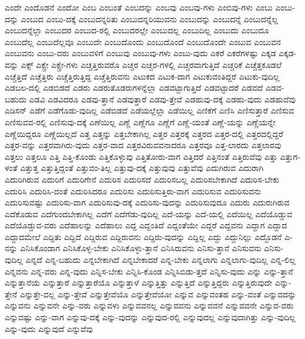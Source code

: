 {ಎಂದೇ
ಎಂದೊಡನೆ
ಎಂದೋ
ಎಂಬ
ಎಂಬಂತೆ
ಎಂಬದನ್ನು
ಎಂಬವು
ಎಂಬವು-ಗಳು
ಎಂಬಿವು-ಗಳು
ಎಂಬು
ಎಂಬು-ದನ್ನು
ಎಂಬುದ
ಎಂಬು-ದಕ್ಕೆ
ಎಂಬುದನ್ನರಿತು
ಎಂಬುದನ್ನರಿಯುವನು
ಎಂಬುದನ್ನು
ಎಂಬುದನ್ನೆ
ಎಂಬುದನ್ನೆಲ್ಲ
ಎಂಬುದನ್ನೆಲ್ಲಾ
ಎಂಬುದರ
ಎಂಬುದ-ರಲ್ಲಿ
ಎಂಬುದರಲ್ಲೇ
ಎಂಬುದಲ್ಲ
ಎಂಬುದಿಲ್ಲ
ಎಂಬುದು
ಎಂಬುದೂ
ಎಂಬುದೆಲ್ಲ
ಎಂಬುದೆಲ್ಲವೂ
ಎಂಬುದೇ
ಎಂಬುದೊಂದು
ಎಂಬುದೊಂದೆ
ಎಂಬುದೊಂದೇ
ಎಂಬುವ
ಎಂಬುವನ
ಎಂಬುವನು
ಎಂಬು-ವರು
ಎಂಬುವಳಿಗೆ
ಎಂಬುವು
ಎಂಬುವು-ಗಳು
ಎಂಬು-ವುದು
ಎಕರೆ
ಎಕರೆಗಳಷ್ಟು
ಎಕ್ಕಡ
ಎಕ್ಕಡ-ವನ್ನು
ಎಕ್ಸ್
ಎಕ್ಸ್ರೇ
ಎಕ್ಸ್ರೇ-ಗಳು
ಎಚ್ಚತ್ತಿರುವರೊ
ಎಚ್ಚರ
ಎಚ್ಚರ-ಗಳಲ್ಲಿ
ಎಚ್ಚರವಾಗುತ್ತಿದೆ
ಎಚ್ಚರಿಕೆ
ಎಚ್ಚೆತ್ತಕೂಡಲೆ
ಎಚ್ಚೆತ್ತಿದೆ
ಎಚ್ಚೆತ್ತಿರು
ಎಚ್ಚೆತ್ತಿರುತ್ತಿದ್ದ
ಎಚ್ಚೆತ್ತಿರುವನು
ಎಟುಕದ
ಎಟುಕ-ದಾಗ
ಎಟುಕುವಂತಿದ್ದರೆ
ಎಟುಕು-ವುದಿಲ್ಲ
ಎಡಬಲ-ದಲ್ಲಿ
ಎಡಬಿಡದೆ
ಎಡರು
ಎಡರುತೊಡರುಗಳನ್ನೆಲ್ಲಾ
ಎಡವಟ್ಟಾಗುತ್ತಿದೆ
ಎಡವಟ್ಟಾದರೆ
ಎಡವದೆ
ಎಡವ-ಬಹುದು
ಎಡವಿ
ಎಡವಿದರೂ
ಎಡವು-ತ್ತಾನೆ
ಎಡವುತ್ತಾರೆ
ಎಡವು-ತ್ತೇವೆ
ಎಡಹುವು-ದಕ್ಕೆ
ಎಡಹು-ವುದು
ಎಡಹುವೆವು
ಎಡಿಸನ್
ಎಡೆಗೆ
ಎಡೆಗೊಡು-ವುದಿಲ್ಲ
ಎಡೆಬಿಡದೆ
ಎಡೆಯಲ್ಲೆಲ್ಲಾ
ಎಡೆಯಿಲ್ಲ
ಎಣಿಕೆಗೆ
ಎಣಿಸಿ
ಎಣಿಸುತ್ತಾರೆ
ಎಣಿಸುವ
ಎಣಿಸುವವ-ರಲ್ಲಿ
ಎಣಿಸುವು-ದಕ್ಕೆ
ಎಣೆಯಿಲ್ಲ
ಎಣ್ಣೆ
ಎಣ್ಣೆಗೂ
ಎಣ್ಣೆಗೆ
ಎಣ್ಣೆ-ಯಂತೆ
ಎಣ್ಣೆ-ಯನ್ನು
ಎಣ್ಣೆಯನ್ನೇ
ಎಣ್ಣೆಯಿದ್ದರೂ
ಎಣ್ಣೆಯಿಲ್ಲದೆ
ಎತ್ತ
ಎತ್ತನ್ನು
ಎತ್ತಬೇಕಾಗಿಲ್ಲ
ಎತ್ತರ
ಎತ್ತರಕ್ಕೆ
ಎತ್ತರದ
ಎತ್ತರ-ದಲ್ಲಿ
ಎತ್ತರದಲ್ಲಿದ್ದರೆ
ಎತ್ತರ-ವನ್ನು
ಎತ್ತರವಾಗಿರು-ವುದು
ಎತ್ತರ-ವಾದ
ಎತ್ತರವಿರುವವನಾದರೂ
ಎತ್ತರವೂ
ಎತ್ತ-ಲಾರದು
ಎತ್ತಲಾರವು
ಎತ್ತಲು
ಎತ್ತಲೂ
ಎತ್ತಿ
ಎತ್ತಿ-ಕೊಂಡು
ಎತ್ತಿಕೊಳ್ಳುವು
ಎತ್ತಿತೋರು-ವಾಗ
ಎತ್ತಿದರೆ
ಎತ್ತಿನಂತೆ
ಎತ್ತಿರುವೆವು
ಎತ್ತು
ಎತ್ತುಗ-ಳಂತೆ
ಎತ್ತುತ್ತ
ಎತ್ತುತ್ತಿದ್ದಂತೆ
ಎತ್ತುವಂ-ತಿಲ್ಲ
ಎತ್ತುವು-ದಕ್ಕೆ
ಎತ್ತುವುವು
ಎತ್ತುವೆವು
ಎದುಗಿರುವ
ಎದುರಾಗಿ
ಎದುರಿಗಿರುವ
ಎದುರಿಗೆ
ಎದುರಿಗೇನೆ
ಎದುರಿಸ
ಎದುರಿಸದೆ
ಎದುರಿಸಬಲ್ಲ
ಎದುರಿಸಬೇಕಾಗಿದೆ
ಎದುರಿಸ-ಬೇಕು
ಎದುರಿಸಿ
ಎದುರಿಸಿ-ದಂತೆ
ಎದುರಿಸಿದರೂ
ಎದುರಿಸು
ಎದುರಿಸುತ್ತಿರು-ವಾಗ
ಎದುರಿಸುವ
ಎದುರಿಸುವನು
ಎದುರಿಸುವಷ್ಟು
ಎದುರಿಸು-ವಾಗ
ಎದುರಿಸುವು-ದಕ್ಕೆ
ಎದುರಿಸು-ವುದನ್ನು
ಎದುರಿಸುವುದೂ
ಎದುರು
ಎದುರುಗಿರುವ
ಎದೆಕೊಡುವ
ಎದೆಗುಂದಬೇಕಾಗಿಲ್ಲ
ಎದೆಗೆ
ಎದೆಗೆಡು-ವುದಿಲ್ಲ
ಎದೆ-ಯನ್ನು
ಎದೆ-ಯಲ್ಲಿ
ಎದೆಯಿಲ್ಲ
ಎದೆಯೊಡ್ಡುವ
ಎದೆಯೊಡ್ಡುವ-ವರು
ಎದೆಹಾಲನ್ನು
ಎದೆಹಾಲು
ಎದ್ದ
ಎದ್ದಂತಿದೆ
ಎದ್ದಂತೆಯೇ
ಎದ್ದರೆ
ಎದ್ದವನು
ಎದ್ದಾಗ
ಎದ್ದಾದ
ಎದ್ದಾದಮೇಲೆ
ಎದ್ದಿತು
ಎದ್ದಿದೆ
ಎದ್ದಿರುವ
ಎದ್ದಿರುವನು
ಎದ್ದಿರು-ವುದನ್ನು
ಎದ್ದಿಲ್ಲ
ಎದ್ದು
ಎದ್ದುನಿಲ್ಲು
ಎದ್ದೊಡನೆ
ಎ-ನನ್ನು
ಎನಿಸಿಕೊಂಡಾಗ
ಎನಿಸಿಕೊಳ್ಳ-ಬೇಕು
ಎನಿಸಿಕೊಳ್ಳು-ತ್ತಾನೆ
ಎನಿಸಿರುವನು
ಎನಿಸು-ತ್ತಾನೆ
ಎನಿಸುವನು
ಎನಿಸು-ವುದಿಲ್ಲ
ಎನ್ನದೆ
ಎನ್ನ-ಬಹುದು
ಎನ್ನಬೇಕಾಗಿದೆ
ಎನ್ನಬೇಕಾದರೆ
ಎನ್ನ-ಬೇಕು
ಎನ್ನಲಾಗು
ಎನ್ನಲಾಗು-ವುದಿಲ್ಲ
ಎನ್ನ-ಲಿಲ್ಲ
ಎನ್ನವನು
ಎನ್ನ-ವರು
ಎನ್ನ-ವುದು
ಎನ್ನಿಸ-ಬೇಕು
ಎನ್ನಿಸಿ-ಕೊಂಡ
ಎನ್ನಿಸಿಬಿಡು-ತ್ತದೆ
ಎನ್ನಿಸು-ವುದು
ಎನ್ನು
ಎನ್ನು-ತ್ತಾನೆ
ಎನ್ನುತ್ತಾನೆಯೆ
ಎನ್ನುತ್ತಾರೆ
ಎನ್ನುತ್ತಾರೆಯೊ
ಎನ್ನುತ್ತಾಳೆ
ಎನ್ನುತ್ತಿತ್ತು
ಎನ್ನುತ್ತಿದೆ
ಎನ್ನುತ್ತಿದ್ದರು
ಎನ್ನುತ್ತಿರುವುದೇ
ಎನ್ನು-ತ್ತೇನೆ
ಎನ್ನುತ್ತೇ-ವಲ್ಲ
ಎನ್ನು-ತ್ತೇವೆ
ಎನ್ನುತ್ತೇವೆಯೊ
ಎನ್ನುತ್ತೇವೆಯೋ
ಎನ್ನುವ
ಎನ್ನುವಂತಹ
ಎನ್ನು-ವಂತೆ
ಎನ್ನುವದನ್ನು
ಎನ್ನುವನು
ಎನ್ನುವನೇ
ಎನ್ನು-ವರು
ಎನ್ನುವಳು
ಎನ್ನುವವನಲ್ಲ
ಎನ್ನುವವನು
ಎನ್ನುವವನೆ
ಎನ್ನುವವನೇ
ಎನ್ನುವ-ವರು
ಎನ್ನುವಷ್ಟು
ಎನ್ನು-ವಾಗ
ಎನ್ನುವು-ದಕ್ಕೆ
ಎನ್ನು-ವುದನ್ನು
ಎನ್ನುವುದ-ರಲ್ಲಿ
ಎನ್ನುವುದಲ್ಲ
ಎನ್ನುವುದಾಗಿತ್ತು
ಎನ್ನು-ವುದಿಲ್ಲ
ಎನ್ನು-ವುದು
ಎನ್ನುವುದೆ
ಎನ್ನುವೆವು
}

